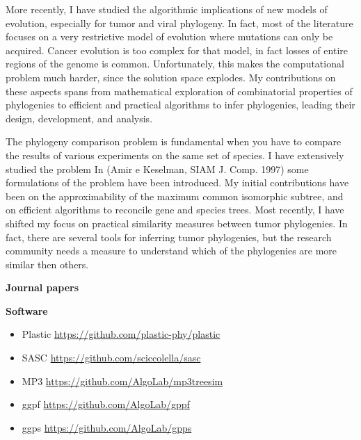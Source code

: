 \documentclass[11pt,a4paper,roman]{moderncv}
\begin{document}
More recently, I have studied the algorithmic implications of new models of
evolution, especially for tumor and viral phylogeny.
In fact, most of the literature focuses on a very restrictive model of evolution
where mutations can only be acquired.
Cancer evolution is too complex for that model, in fact losses of entire regions
of the genome is common.
Unfortunately, this makes the computational problem much harder, since the
solution space explodes.
My contributions on these aspects spans from mathematical exploration of
combinatorial properties of phylogenies to efficient and practical algorithms to
infer phylogenies, leading their design, development, and analysis.


The phylogeny comparison problem is fundamental when you have to compare
the results of various experiments on the same set of species. I have
extensively studied the problem In (Amir e Keselman, SIAM J. Comp. 1997)
some formulations of the problem have been introduced. My initial contributions
have been on the approximability of the maximum common isomorphic
subtree, and on efficient algorithms to reconcile gene and species trees.
Most recently, I have shifted my focus on practical similarity measures between
tumor phylogenies.
In fact, there are several tools for inferring tumor phylogenies, but the
research community needs a measure to understand which of the phylogenies are
more similar then others.


\textbf{Journal papers}

\cite{a16070333}
\cite{DBLP:journals/jcb/AliCLVP21}
\cite{DBLP:journals/bioinformatics/CiccolellaRGPSB21}
\cite{DBLP:journals/bioinformatics/CiccolellaBDBPV21}
\cite{DBLP:journals/bmcbi/CiccolellaGPVHB20}
\cite{DBLP:journals/tcbb/BonizzoniCVS19}
\cite{DBLP:journals/tcs/BonizzoniCVRT17}
\cite{DBLP:journals/fuin/BonizzoniCVRT17}
\cite{bonizzoniExplainingEvolutionConstrained2014}
\cite{DBLP:journals/tcs/BonizzoniVD05}
\cite{DBLP:journals/bioinformatics/VedovaW02}
\cite{DBLP:journals/ijfcs/BonizzoniVM00}


\textbf{Software}

\begin{itemize}
	\item
	      Plastic \url{https://github.com/plastic-phy/plastic}
	\item
	      SASC \url{https://github.com/sciccolella/sasc}
	\item
	      MP3 \url{https://github.com/AlgoLab/mp3treesim}
	\item
	      ggpf \url{https://github.com/AlgoLab/gppf}
	\item
	      ggps \url{https://github.com/AlgoLab/gpps}
\end{itemize}
\end{document}
